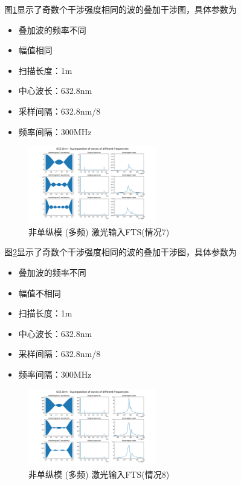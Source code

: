 \documentclass[conference]{IEEEtran}
\begin{document}
图\ref{pic16}显示了奇数个干涉强度相同的波的叠加干涉图，具体参数为
\begin{itemize}
    \item 叠加波的频率不同
    \item 幅值相同
    \item 扫描长度：1m
    \item 中心波长：632.8nm
    \item 采样间隔：632.8nm/8
    \item 频率间隔：300MHz
\end{itemize}
\begin{figure}[htbp]
    \centerline{\includegraphics[width=0.5\textwidth]{pic16.png}}
    \caption{非单纵模 (多频) 激光输入FTS(情况7)}
    \label{pic16}
\end{figure}

图\ref{pic17}显示了奇数个干涉强度相同的波的叠加干涉图，具体参数为
\begin{itemize}
    \item 叠加波的频率不同
    \item 幅值不相同
    \item 扫描长度：1m
    \item 中心波长：632.8nm
    \item 采样间隔：632.8nm/8
    \item 频率间隔：300MHz
\end{itemize}
\begin{figure}[htbp]
    \centerline{\includegraphics[width=0.5\textwidth]{pic17.png}}
    \caption{非单纵模 (多频) 激光输入FTS(情况8)}
    \label{pic17}
\end{figure}
\end{document}
